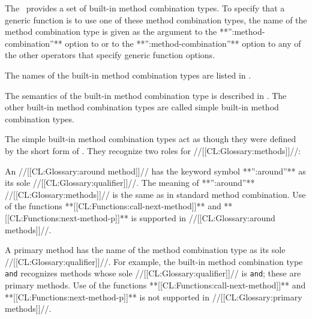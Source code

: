 \endsubsubsection%


The \CLOS\ provides a set of built-in method combination types.  To
specify that a generic function is to use one of these method
combination types, the name of the method combination type is given as
the argument to the **'':method-combination''** option to 
 or to the **'':method-combination''** option to any of the
other operators that specify generic function options.

The names of the built-in  method combination types are listed in \thenextfigure.
\idxref{+}%
%
%
%
%
%
%
%
%


The semantics of the  built-in method combination type is
described in \secref\StdMethComb.  The other
built-in method combination types are called simple built-in method
combination types.

The simple built-in method combination types act as though they were
defined by the short form of .  
They recognize two roles for //[[CL:Glossary:methods]]//:

\beginlist
                                                                  
\itemitem{\bull} An //[[CL:Glossary:around method]]// has the keyword symbol 
**'':around''** as its sole //[[CL:Glossary:qualifier]]//.  The meaning of 
**'':around''** //[[CL:Glossary:methods]]// is the same as in standard method combination.
Use of the functions **[[CL:Functions:call-next-method]]** and **[[CL:Functions:next-method-p]]**
is supported in //[[CL:Glossary:around methods]]//.

\itemitem{\bull} A primary method has the name of the method combination
type as its sole //[[CL:Glossary:qualifier]]//.  For example, the built-in method
combination type {\tt and} recognizes methods whose sole //[[CL:Glossary:qualifier]]// is
{\tt and}; these are primary methods. Use of the functions 
**[[CL:Functions:call-next-method]]** and **[[CL:Functions:next-method-p]]** is not supported 
in //[[CL:Glossary:primary methods]]//.

\endlist

